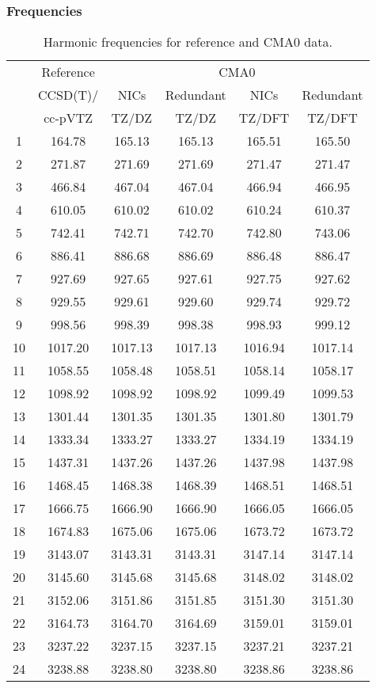 \documentclass[10pt,oneside]{article}
\begin{document}
\begin{table}[h!]
\subsubsection*{Frequencies}
\centering
\caption{Harmonic frequencies for reference and CMA0 data.}
\begin{tabular}{cccccc}
\toprule
{} & Reference & \multicolumn{4}{c}{CMA0} \\
{} &  CCSD(T)/ &    NICs &  Redundant &    NICs & Redundant \\
{} &   cc-pVTZ &   TZ/DZ &      TZ/DZ &  TZ/DFT &    TZ/DFT \\
\midrule
1  &    164.78 &  165.13 &     165.13 &  165.51 &    165.50 \\
2  &    271.87 &  271.69 &     271.69 &  271.47 &    271.47 \\
3  &    466.84 &  467.04 &     467.04 &  466.94 &    466.95 \\
4  &    610.05 &  610.02 &     610.02 &  610.24 &    610.37 \\
5  &    742.41 &  742.71 &     742.70 &  742.80 &    743.06 \\
6  &    886.41 &  886.68 &     886.69 &  886.48 &    886.47 \\
7  &    927.69 &  927.65 &     927.61 &  927.75 &    927.62 \\
8  &    929.55 &  929.61 &     929.60 &  929.74 &    929.72 \\
9  &    998.56 &  998.39 &     998.38 &  998.93 &    999.12 \\
10 &   1017.20 & 1017.13 &    1017.13 & 1016.94 &   1017.14 \\
11 &   1058.55 & 1058.48 &    1058.51 & 1058.14 &   1058.17 \\
12 &   1098.92 & 1098.92 &    1098.92 & 1099.49 &   1099.53 \\
13 &   1301.44 & 1301.35 &    1301.35 & 1301.80 &   1301.79 \\
14 &   1333.34 & 1333.27 &    1333.27 & 1334.19 &   1334.19 \\
15 &   1437.31 & 1437.26 &    1437.26 & 1437.98 &   1437.98 \\
16 &   1468.45 & 1468.38 &    1468.39 & 1468.51 &   1468.51 \\
17 &   1666.75 & 1666.90 &    1666.90 & 1666.05 &   1666.05 \\
18 &   1674.83 & 1675.06 &    1675.06 & 1673.72 &   1673.72 \\
19 &   3143.07 & 3143.31 &    3143.31 & 3147.14 &   3147.14 \\
20 &   3145.60 & 3145.68 &    3145.68 & 3148.02 &   3148.02 \\
21 &   3152.06 & 3151.86 &    3151.85 & 3151.30 &   3151.30 \\
22 &   3164.73 & 3164.70 &    3164.69 & 3159.01 &   3159.01 \\
23 &   3237.22 & 3237.15 &    3237.15 & 3237.21 &   3237.21 \\
24 &   3238.88 & 3238.80 &    3238.80 & 3238.86 &   3238.86 \\
\bottomrule
\end{tabular}
\end{table}
\end{document}
